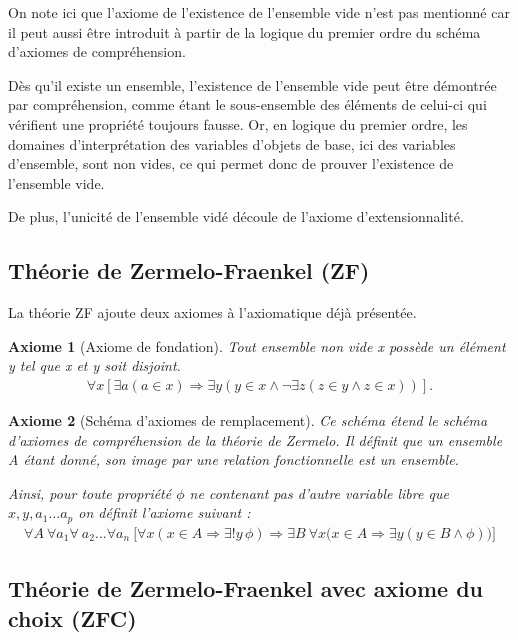 \documentclass[10pt,a4paper]{article}
\newtheorem{axiom}{Axiome}[section]
\begin{document}
On note ici que l'axiome de l'existence de l'ensemble vide n'est pas mentionné car il peut aussi être introduit à partir de la logique du premier ordre du schéma d'axiomes de compréhension.

Dès qu'il existe un ensemble, l'existence de l'ensemble vide peut être démontrée par compréhension, comme étant le sous-ensemble des éléments de celui-ci qui vérifient une propriété toujours fausse.
Or, en logique du premier ordre, les domaines d'interprétation des variables d'objets de base, ici des variables d'ensemble, sont non vides, ce qui permet donc de prouver l'existence de l'ensemble vide.

De plus, l'unicité de l'ensemble vidé découle de l'axiome d'extensionnalité.

\subsection{Théorie de Zermelo-Fraenkel (ZF)}

La théorie ZF ajoute deux axiomes à l'axiomatique déjà présentée.

\begin{axiom}[Axiome de fondation] Tout ensemble non vide x possède un élément y tel que x et y soit disjoint.
\begin{align}
\forall x [ \exists a ( a \in x) \Rightarrow \exists y ( y \in x \land \lnot \exists z (z \in y \land z \in x))]. 
\end{align}
\end{axiom}

\begin{axiom}[Schéma d'axiomes de remplacement] Ce schéma étend le schéma d'axiomes de compréhension de la théorie de Zermelo. Il définit que un ensemble A étant donné, son image par une relation fonctionnelle est un ensemble.

Ainsi, pour toute propriété $\phi$ ne contenant pas d'autre variable libre que $x, y, a_1 \ldots a_p$ on définit l'axiome suivant :
\begin{align}
\forall A \ \forall a_1 \forall \ a_2 \ldots \forall a_n \ 
\bigl[ \forall x ( x\in A \Rightarrow \exists! y\,\phi ) \Rightarrow \exists B \ \forall x \bigl(x\in A \Rightarrow \exists y (y\in B \land \phi) \bigr) \bigr]
\end{align}
\end{axiom}

\subsection{Théorie de Zermelo-Fraenkel avec axiome du choix (ZFC)}
\end{document}
